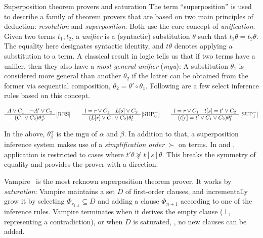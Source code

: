 \begin{paragraph}{Superposition theorem provers and saturation}
The term ``superposition'' is used to describe a family of theorem provers that are based on two main principles of deduction: \emph{resolution} and \emph{superposition}.
Both use the core concept of \emph{unification}.
Given two terms $t_1, t_2$, a \emph{unifier} is a (syntactic) substitution $\theta$ such that $t_1\theta = t_2\theta$.
The equality here designates syntactic identity, and $t\theta$ denotes applying a substitution to a term.
A classical result in logic tells us that if two terms have a unifier, then they also have a \emph{most general unifier} (\emph{mgu}):
A substitution $\theta_1$ is considered more general than another $\theta_2$ if the latter can be obtained from the former via sequential composition, $\theta_2 = \theta'\circ\theta_1$.
Following are a few select inference rules based on this concept.

\noindent\vspace{0pt}
\[
\begin{array}{c}
A \lor C_1 \quad \lnot A' \lor C_2 \\ \hline
(C_1 \lor C_2)\theta^{\scriptscriptstyle A}_{\scriptscriptstyle \!A'}
\end{array}
\,\textrm{[RES]}
\qquad
\begin{array}{c}
l=r \lor C_1 \quad L[s] \lor C_2 \\ \hline
(L[r] \lor C_1 \lor C_2)\theta^{s}_{l}
\end{array}
\,\textrm{[SUP$^=_0$]}
\qquad
\begin{array}{c}
l=r \lor C_1 \quad t[s]=t' \lor C_2 \\ \hline
(t[r]=t' \lor C_1 \lor C_2)\theta^{s}_{l}
\end{array}
\,\textrm{[SUP$^=_1$]}
\]

In the above, $\theta^{\alpha}_{\!\beta}$ is the mgu of $\alpha$ and $\beta$.
In addition to that, a superposition inference system makes use of a \emph{simplification order} $\succ$ on terms.
In  and ,
application is restricted to cases where
$t'\theta \not\succeq t[s]\theta$.
This breaks the symmetry of equality and provides the prover with a direction.

Vampire~\cite{JAR1995:Voronkov,CAV2013:Kovacs} is the most reknown superposition theorem prover.
It works by \emph{saturation}: Vampire maintains a set $D$ of first-order clauses,
and incrementally grow it by selecting $\Phi_{r_{1..k}} \subseteq D$ and adding a clause $\Phi_{n+1}$ according to one of the inference rules.
Vampire terminates when it derives the empty clause ($\bot$, representing a contradiction),
or when $D$ is saturated, \ie, no new clauses can be added.


\end{paragraph}
